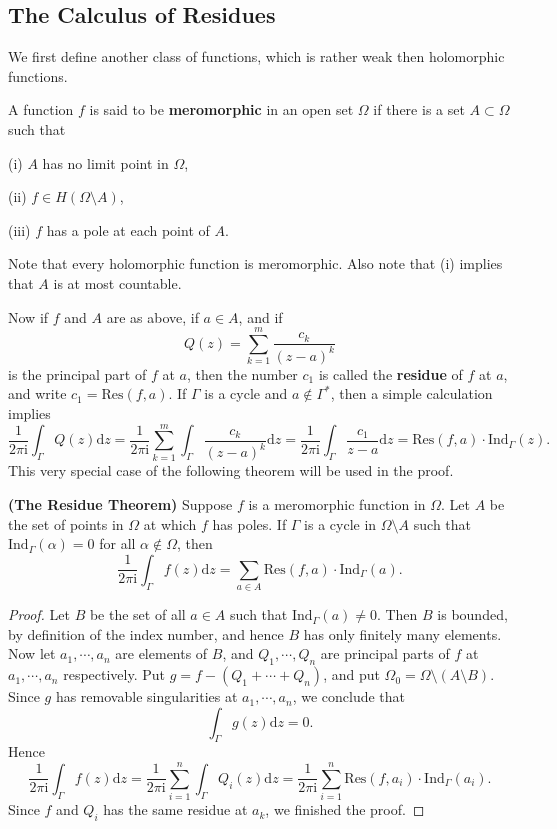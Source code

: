 \subsection{The Calculus of Residues}
We first define another class of functions, which is rather weak then holomorphic functions.
\begin{definition}
A function $f$ is said to be \textbf{meromorphic} in an open set $\Omega$ if there is a set $A\subset\Omega$ such that \par
(i) $A$ has no limit point in $\Omega$,\par
(ii) $f\in H(\Omega\setminus A)$,\par
(iii) $f$ has a pole at each point of $A$.
\end{definition}
Note that every holomorphic function is meromorphic. Also note that (i) implies that $A$ is at most countable.\par
Now if $f$ and $A$ are as above, if $a\in A$, and if 
$$
Q\left( z \right) =\sum_{k=1}^m{\frac{c_k}{\left( z-a \right) ^k}}
$$
is the principal part of $f$ at $a$, then the number $c_1$ is called the \textbf{residue} of $f$ at $a$, and write $c_1=\mathrm{Res}(f,a)$. If $\Gamma$ is a cycle and $a\notin\Gamma^*$, then a simple calculation implies 
$$
\frac{1}{2\pi \mathrm{i}}\int_{\Gamma}{Q\left( z \right) \mathrm{d}z}=\frac{1}{2\pi \mathrm{i}}\sum_{k=1}^m{\int_{\Gamma}{\frac{c_k}{\left( z-a \right) ^k}\mathrm{d}z}}=\frac{1}{2\pi \mathrm{i}}\int_{\Gamma}{\frac{c_1}{z-a}\mathrm{d}z}=\mathrm{Res}\left( f,a \right) \cdot \mathrm{Ind}_{\Gamma}\left( z \right) .
$$
This very special case of the following theorem will be used in the proof.
\begin{theorem}{\textbf{(The Residue Theorem)}}
Suppose $f$ is a meromorphic function in $\Omega$. Let $A$ be the set of points in $\Omega$ at which $f$ has poles. If $\Gamma$ is a cycle in $\Omega\setminus A$ such that $\mathrm{Ind}_\Gamma(\alpha)=0$ for all $\alpha\notin\Omega$, then 
$$
\frac{1}{2\pi \mathrm{i}}\int_{\Gamma}{f\left( z \right) \mathrm{d}z}=\sum_{a\in A}{\mathrm{Res}\left( f,a \right) \cdot \mathrm{Ind}_{\Gamma}\left( a \right)}.
$$
\end{theorem}
\begin{proof}
Let $B$ be the set of all $a\in A$ such that $\mathrm{Ind}_\Gamma(a)\ne 0$. Then $B$ is bounded, by definition of the index number, and hence $B$ has only finitely many elements. Now let $a_1,\cdots,a_n$ are elements of $B$, and $Q_1,\cdots,Q_n$ are principal parts of $f$ at $a_1,\cdots,a_n$ respectively. Put $g=f-(Q_1+\cdots+Q_n)$, and put $\Omega_0=\Omega\setminus(A\setminus B)$. Since $g$ has removable singularities at $a_1,\cdots,a_n$, we conclude that 
$$\int_\Gamma g(z)\mathrm{d}z=0.$$
Hence 
$$
\frac{1}{2\pi \mathrm{i}}\int_{\Gamma}{f\left( z \right) \mathrm{d}z}=\frac{1}{2\pi \mathrm{i}}\sum_{i=1}^n{\int_{\Gamma}{Q_i\left( z \right) \mathrm{d}z}}=\frac{1}{2\pi \mathrm{i}}\sum_{i=1}^n{\mathrm{Res}\left( f,a_i \right) \cdot \mathrm{Ind}_{\Gamma}\left( a_i \right)}.
$$
Since $f$ and $Q_i$ has the same residue at $a_k$, we finished the proof.
\end{proof}
